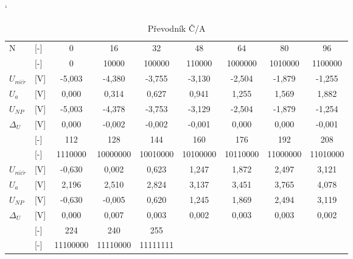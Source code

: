 \documentclass[a4paper, czech]{article}
\begin{document}
\begin{table}[H]
    \catcode`
    \centering
    \caption{Převodník Č/A}
    \begin{tabular}{ll|ccccccc}
        \toprule
        \multirow{2}{*}{N} & [-]                        & 0      & 16     & 32     & 48     & 64      & 80      & 96      \\
                           & [-]                        & 0      & 10000  & 100000 & 110000 & 1000000 & 1010000 & 1100000 \\
        \cmidrule(rl){1-9}
        $U_{m \check{e} \check{r}}$               & [V] & -5,003 & -4,380 & -3,755 & -3,130 & -2,504  & -1,879  & -1,255  \\
        $U_a$                 & [V]                     & 0,000  & 0,314  & 0,627  & 0,941  & 1,255   & 1,569   & 1,882   \\
        $U_{NP}$                & [V]                   & -5,003 & -4,378 & -3,753 & -3,129 & -2,504  & -1,879  & -1,254  \\
        $\Delta_U$                 & [V]                & 0,000  & -0,002 & -0,002 & -0,001 & 0,000   & 0,000   & -0,001 \\
        \cmidrule(){1-9}
        \morecmidrules
        \cmidrule(){1-9}
        \multirow{2}{*}{N} & [-]                        & 112     & 128      & 144      & 160      & 176      & 192      & 208      \\
         & [-]                        & 1110000 & 10000000 & 10010000 & 10100000 & 10110000 & 11000000 & 11010000 \\
        \cmidrule(rl){1-9}
        $U_{m \check{e} \check{r}}$               & [V] & -0,630  & 0,002    & 0,623    & 1,247    & 1,872    & 2,497    & 3,121    \\
        $U_a$                 & [V]                     & 2,196   & 2,510    & 2,824    & 3,137    & 3,451    & 3,765    & 4,078    \\
        $U_{NP}$                & [V]                   & -0,630  & -0,005   & 0,620    & 1,245    & 1,869    & 2,494    & 3,119    \\
        $\Delta_U$                 & [V]                & 0,000   & 0,007    & 0,003    & 0,002    & 0,003    & 0,003    & 0,002    \\
        \cmidrule(){1-9}
        \morecmidrules
        \cmidrule(){1-5}
        \multirow{2}{*}{N} & [-]                        & 224      & 240      & 255      \\
                   & [-]                        & 11100000 & 11110000 & 11111111 \\

\end{tabular}
\end{table}
\end{document}

